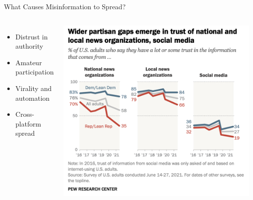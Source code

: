 \documentclass[nobackground,dvipsnames,table,aspectratio=169]{beamer}
\begin{document}
\begin{frame}{What Causes Misinformation to Spread?}
    \begin{columns}
            \begin{itemize}
                \item Distrust in authority
                \item Amateur participation
                \item Virality and automation
                \item Cross-platform spread
            \end{itemize}
            \includegraphics[width=\textwidth]{partisan-trust-gap}
    \end{columns}
\end{frame}
\end{document}
